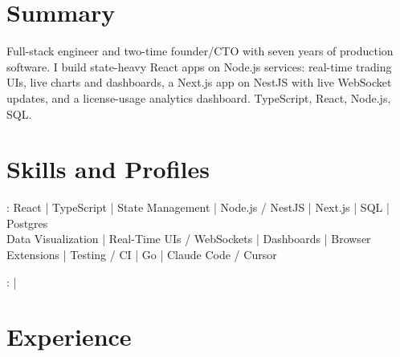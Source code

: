 \documentclass[print]{jack-resume}
\begin{document}
\pagecolor{darkmodeBackground}


\begin{minipage}[t][1cm][t]{.03\textwidth}
    \hfill
\end{minipage}

\section{Summary}
Full-stack engineer and two-time founder/CTO with seven years of production software. I build state-heavy React apps on Node.js services: real-time trading UIs, live charts and dashboards, a Next.js app on NestJS with live WebSocket updates, and a license-usage analytics dashboard. TypeScript, React, Node.js, SQL.
\sectionsep

\section{Skills and Profiles}
:
React \hfill | \hfill
TypeScript \hfill | \hfill
State Management \hfill | \hfill
Node.js / NestJS \hfill | \hfill
Next.js \hfill | \hfill
SQL \hfill | \hfill
Postgres \\
\hspace{1.0cm} Data Visualization \hfill | \hfill
Real-Time UIs / WebSockets \hfill | \hfill
Dashboards \hfill | \hfill
Browser Extensions \hfill | \hfill
Testing / CI \hfill | \hfill
Go \hfill | \hfill
Claude Code / Cursor \\

\raggedright{
    :
      \href{https://www.linkedin.com/in/jack-sturtevant/}{ \ExternalLink} |
     \href{https://github.com/jacksturt}{ \ExternalLink}}

\section{Experience}
\end{document}
